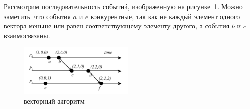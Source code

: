 Рассмотрим последовательность событий, изображенную на рисунке~\ref{fig:vector-algo}. Можно заметить, что события $a$ и $e$ конкурентные, так как не каждый элемент одного вектора меньше или равен соответствующему элементу другого, а события $b$ и $c$ взаимосвязаны. 

\begin{figure}
\centering
\includegraphics[width=0.5\textwidth]{img/vector.jpg}
\caption{векторный алгоритм}
\label{fig:vector-algo}
\end{figure}

